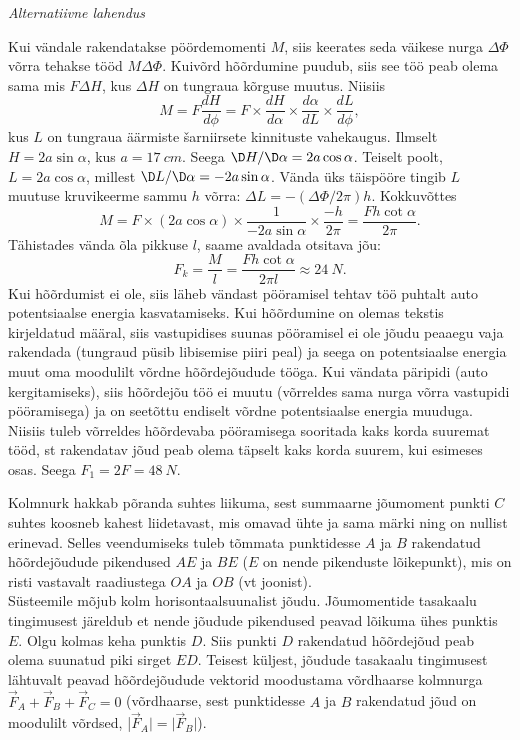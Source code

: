 \documentclass[10pt, twoside]{article}
\begin{document}
{\vspace{0.5\baselineskip}

\emph{Alternatiivne lahendus}

Kui vändale rakendatakse pöördemomenti $M$, siis keerates seda
väikese nurga $\Delta\Phi$ võrra tehakse tööd $M\Delta\Phi$. Kuivõrd hõõrdumine puudub, siis see
töö peab olema sama mis $F\Delta H$, kus $\Delta H$ on tungraua kõrguse muutus. Niisiis
\[
M=F \frac{d H}{d \phi}=F \times \frac{d H}{d \alpha} \times \frac{d \alpha}{d L} \times \frac{d L}{d \phi},
\]
kus $L$ on tungraua äärmiste šarniirsete kinnituste vahekaugus. Ilmselt $H = 2a \sin\alpha$,
kus $a = \SI{17}{cm}$. Seega $\D H/\D\alpha = 2a \cos\alpha$. Teiselt poolt, $L = 2a \cos\alpha$, millest $\D L/\D\alpha =
-2a \sin\alpha$. Vända üks täispööre tingib $L$ muutuse kruvikeerme sammu $h$ võrra: $\Delta L =
-(\Delta\Phi/2\pi)h$. Kokkuvõttes
\[
M=F \times(2 a \cos \alpha) \times \frac{1}{-2 a \sin \alpha} \times \frac{-h}{2 \pi}=\frac{F h \cot \alpha}{2 \pi}.
\]
Tähistades vända õla pikkuse $l$, saame avaldada otsitava jõu:
\[
F_{k}=\frac{M}{l}=\frac{F h \cot \alpha}{2 \pi l} \approx \SI{24}{N}.
\]
\osa Kui hõõrdumist ei ole, siis läheb vändast pööramisel tehtav töö puhtalt auto
potentsiaalse energia kasvatamiseks. Kui hõõrdumine on olemas tekstis kirjeldatud
määral, siis vastupidises suunas pööramisel ei ole jõudu peaaegu vaja rakendada
(tungraud püsib libisemise piiri peal) ja seega on potentsiaalse energia muut oma
moodulilt võrdne hõõrdejõudude tööga. Kui vändata päripidi (auto kergitamiseks),
siis hõõrdejõu töö ei muutu (võrreldes sama nurga võrra vastupidi pööramisega) ja
on seetõttu endiselt võrdne potentsiaalse energia muuduga. Niisiis tuleb võrreldes
hõõrdevaba pööramisega sooritada kaks korda suuremat tööd, st rakendatav jõud
peab olema täpselt kaks korda suurem, kui esimeses osas. Seega $F_1 = 2F = \SI{48}{N}$.
\probend
\bigskip


\solu
\osa Kolmnurk hakkab põranda suhtes liikuma, sest summaarne jõumoment punkti $C$ suhtes koosneb kahest liidetavast, mis omavad ühte ja sama märki ning on nullist erinevad. Selles veendumiseks tuleb tõmmata punktidesse $A$ ja $B$ rakendatud hõõrdejõudude pikendused $AE$ ja $BE$ ($E$ on nende pikenduste lõikepunkt), mis on risti vastavalt raadiustega $OA$ ja $OB$ (vt joonist).\\
\osa Süsteemile mõjub kolm horisontaalsuunalist jõudu. Jõumomentide tasakaalu tingimusest järeldub et nende jõudude pikendused peavad lõikuma ühes punktis $E$. Olgu kolmas keha punktis $D$. Siis punkti $D$ rakendatud hõõrdejõud peab olema suunatud piki sirget $ED$. Teisest küljest, jõudude tasakaalu tingimusest lähtuvalt peavad hõõrdejõudude vektorid moodustama võrdhaarse kolmnurga $\vec F_A+\vec F_B+\vec F_C = 0$ (võrdhaarse, sest punktidesse $A$ ja $B$ rakendatud jõud on moodulilt võrdsed, |$\vec F_A| = |\vec F_B|$).

}
\end{document}
